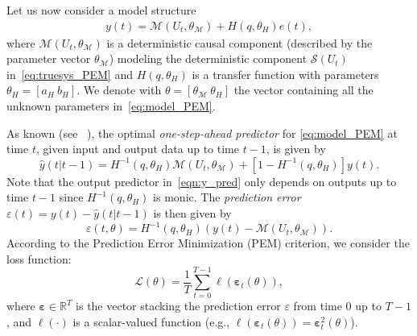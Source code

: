 \documentclass{article}
\newcommand{\nsamp}{T}
\newcommand{\Name}{\emph{dynoNet}}
\begin{document}

Let us now consider a model structure
\begin{align}
\label{eq:model_PEM}
y(t) = \mathcal{M}(U_t, \theta_\mathcal{M}) + H(q, \theta_H) e(t),
\end{align}
where $\mathcal{M}(U_t,\theta_{\mathcal{M}})$ is a deterministic causal component (described by the parameter vector $\theta_{\mathcal{M}}$) modeling the deterministic component  $\mathcal{S}(U_t)$ in~\eqref{eq:truesys_PEM}  
and $H(q, \theta_H)$ is a transfer function with parameters $\theta_H = [a_H \ b_H]$. We denote with $\theta = [\theta_{\mathcal{M}} \ \theta_{H}]$ the vector containing all the unknown parameters in~\eqref{eq:model_PEM}. 

As known (see ~\cite[Ch. 2.3]{ljung:1999system}), the optimal \emph{one-step-ahead predictor} for  \eqref{eq:model_PEM} at time $t$, given input and output data up to time $t-1$, is given by
\begin{equation} \label{eqn:y_pred}
\hat y(t|t-1) = H^{-1}(q, \theta_H) \mathcal{M}(U_t, \theta_\mathcal{M}) + [1\!-\!H^{-1}(q, \theta_H)]y(t).
\end{equation}
{Note that the output predictor in~\eqref{eqn:y_pred}  only depends on outputs up to time $t-1$ since $\!H^{-1}(q, \theta_H)$ is monic.}
The  \emph{prediction error}  $\varepsilon(t) = y(t) - \hat y(t|t-1)$ is then given by
\begin{equation}
\varepsilon(t, \theta) = H^{-1}(q, \theta_H)(y(t) - \mathcal{M}(U_t, \theta_\mathcal{M})).
\end{equation}
According to the Prediction Error Minimization (PEM) criterion, we consider the loss function:
\begin{equation}
\label{eq:loss_PEM}
\mathcal{L}(\theta) = \frac{1}{\nsamp} \sum_{t=0}^{\nsamp -1} \ell(\bm{\varepsilon}_t(\theta)),
\end{equation}
where $\bm{\varepsilon} \in \mathbb{R}^\nsamp$ is the  vector stacking the prediction error $\varepsilon$ from time $0$ up to  $\nsamp - 1$, and 
 $\ell(\cdot)$ is a scalar-valued function (e.g., $\ell(\bm{\varepsilon}_t(\theta))=\bm{\varepsilon}^2_t(\theta)$).
\end{document}
